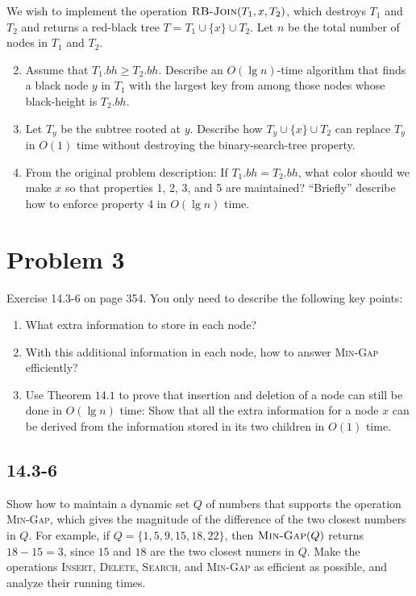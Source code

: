 \documentclass{../../class}
\begin{document}
We wish to implement the operation $\textsc{RB-Join}(T_1, x, T_2)$, which destroys $T_1$ and $T_2$ and returns a red-black tree $T = T_1 \cup \{x\} \cup T_2$. Let $n$ be the total number of nodes in $T_1$ and $T_2$.
\begin{enumerate}[label=\textbf{\textit{\alph*}}.] \setcounter{enumi}{1}
    \item Assume that $T_1.bh \geq T_2.bh$. Describe an $O(\lg{n})$-time algorithm that finds a black node $y$ in $T_1$ with the largest key from among those nodes whose black-height is $T_2.bh$.
    \item Let $T_y$ be the subtree rooted at $y$. Describe how $T_y \cup \{x\} \cup T_2$ can replace $T_y$ in $O(1)$ time without destroying the binary-search-tree property.
    \item From the original problem description: If $T_1.bh = T_2.bh$, what color should we make $x$ so that properties 1, 2, 3, and 5 are maintained? \enquote{Briefly} describe how to enforce property 4 in $O(\lg{n})$ time.
\end{enumerate}

\newpage
\section*{Problem 3}
\begin{tcolorbox}
    Exercise 14.3-6 on page 354. You only need to describe the following key points:
    \begin{enumerate}
        \item What extra information to store in each node?
        \item With this additional information in each node, how to answer \textsc{Min-Gap} efficiently?
        \item Use Theorem $14.1$ to prove that insertion and deletion of a node can still be done in $O(\lg{n})$ time: Show that all the extra information for a node $x$ can be derived from the information stored in its two children in $O(1)$ time.
    \end{enumerate}
\end{tcolorbox}

\subsection*{14.3-6}
Show how to maintain a dynamic set $Q$ of numbers that supports the operation \textsc{Min-Gap}, which gives the magnitude of the difference of the two closest numbers in $Q$. For example, if $Q = \{1, 5, 9, 15, 18, 22\}$, then $\textsc{Min-Gap}(Q)$ returns $18-15=3$, since $15$ and $18$ are the two closest numers in $Q$. Make the operations \textsc{Insert}, \textsc{Delete}, \textsc{Search}, and \textsc{Min-Gap} as efficient as possible, and analyze their running times.
\end{document}
